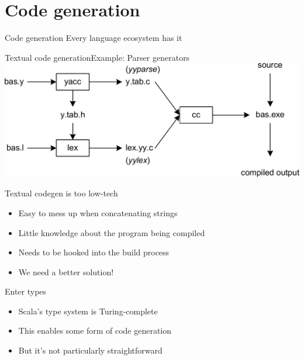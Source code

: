 \documentclass[compress,xcolor={usenames,dvipsnames,table}]{beamer}
\begin{document}
  \section{Code generation}


\begin{frame}[fragile]{Code generation}
  Every language ecosystem has it
\end{frame}

\begin{frame}[fragile]{Textual code generation}{Example: Parser generators}
  \includegraphics[width=\linewidth]{img/yacc.png}
\end{frame}

\begin{frame}[fragile]{Textual codegen is too low-tech}
  \begin{itemize}
    \item Easy to mess up when concatenating strings
    \item Little knowledge about the program being compiled
    \item Needs to be hooked into the build process
    \item We need a better solution!
  \end{itemize}
\end{frame}

\begin{frame}{Enter types}
  \begin{itemize}
    \item Scala's type system is Turing-complete
    \item This enables some form of code generation
    \item But it's not particularly straightforward
  \end{itemize}
\end{frame}
\end{document}
